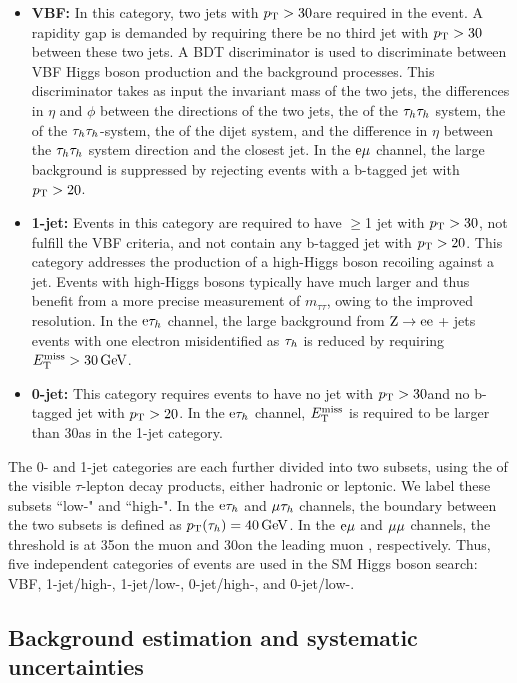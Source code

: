 \documentclass[11pt,twoside,a4paper,cmspaper,final,collab]{cms-tdr}
\begin{document}
\begin{itemize}
\item \textbf{VBF:}
In this category, two jets with $p_{\mathrm{T}}>30$\GeV are required in the event.
A rapidity gap is demanded by requiring there be no third jet with $p_{\mathrm{T}}>30$\GeV between these two jets.
A BDT discriminator is used to discriminate between VBF Higgs boson production and the background processes.
This discriminator takes as input the invariant mass of the two jets,
the differences in $\eta$ and $\phi$ between the directions of the two jets,
the \pt of the $\tau_h\tau_h$ system, the \pt of the $\tau_h\tau_h$-\MET system, the \pt of the dijet system,
and the difference in $\eta$ between the $\tau_h\tau_h$ system direction and the closest jet.
In the $\mathrm{e}{\mu}$ channel, the large \ttbar background is suppressed by rejecting events with a b-tagged jet with $p_{\mathrm{T}}>20$\GeV.
\item \textbf{1-jet:} Events in this category are required to have $\ge$1 jet with $p_{\mathrm{T}}>30$\GeV,
not fulfill the VBF criteria,
and not contain any b-tagged jet with $p_{\mathrm{T}}>20$\GeV.
This category addresses the production of a high-\pt Higgs boson recoiling against a jet.
Events with high-\pt Higgs bosons typically have much larger \MET and thus benefit from a more precise measurement of $m_{\tau\tau}$,
owing to the improved \MET resolution.
In the $\mathrm{e}\tau_h$ channel, the large background from  $\mathrm{Z} \to \mathrm{e}\mathrm{e}$ + jets events with one electron misidentified as $\tau_h$ is reduced by requiring $E_{\mathrm{T}}^{\text{miss}}>30\,\text{Ge\hspace{-.08em}V}$.
\item \textbf{0-jet:} This category requires events to have no jet with $p_{\mathrm{T}}>30$\GeV and no b-tagged jet with $p_{\mathrm{T}}>20$\GeV.
In the $\mathrm{e}\tau_h$ channel, $E_{\mathrm{T}}^{\text{miss}}$ is required to be larger than 30\GeV as in the 1-jet category.
\end{itemize}


The 0- and 1-jet categories are each further divided into two subsets, using the \PT of the visible $\tau$-lepton decay products, either hadronic or leptonic. We label these subsets ``low-\pt" and ``high-\pt".
In the $\mathrm{e}\tau_h$ and ${\mu}\tau_h$ channels, the boundary between the two subsets is defined as $p_{\mathrm{T}}(\tau_h)=40\,\text{Ge\hspace{-.08em}V}$.
In the $\mathrm{e}{\mu}$ and ${\mu}{\mu}$ channels, the threshold is at 35\GeV on the muon \PT and 30\GeV on the leading muon \PT, respectively.
Thus, five independent categories of events are used in the SM Higgs boson search: VBF, 1-jet/high-\PT, 1-jet/low-\PT, 0-jet/high-\PT, and 0-jet/low-\PT.


\subsection{Background estimation and systematic uncertainties}
\end{document}
